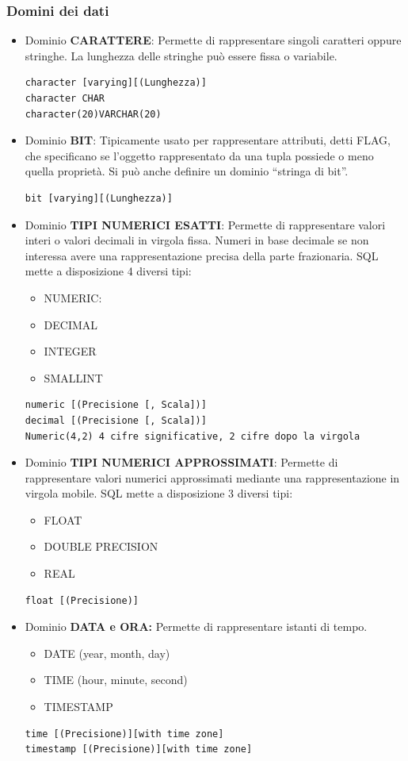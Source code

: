 \documentclass{article}
\newcommand{\sitemize}[1]{%
  \begin{itemize}[label=$\diamond$]
    #1
  \end{itemize}
}
\begin{document}
\subsubsection{Domini dei dati}
\begin{itemize}
	\item Dominio \textbf{CARATTERE}: Permette di rappresentare singoli caratteri oppure stringhe. La lunghezza delle stringhe può essere fissa o variabile.
	\begin{lstlisting}[style=sqlstyle]
character [varying][(Lunghezza)]
character CHAR
character(20)VARCHAR(20)
	\end{lstlisting}
	\item Dominio \textbf{BIT}: Tipicamente usato per rappresentare attributi, detti FLAG, che 	specificano se l'oggetto rappresentato da una tupla possiede o meno 	quella proprietà. Si può anche definire un dominio “stringa di bit”.

		\begin{lstlisting}[style=sqlstyle]
bit [varying][(Lunghezza)]
	\end{lstlisting}
	\item Dominio \textbf{TIPI NUMERICI ESATTI}: Permette di rappresentare valori interi o valori decimali in virgola
	fissa. Numeri in base decimale se non interessa avere una rappresentazione precisa della parte frazionaria. SQL mette a disposizione 4 diversi tipi: \sitemize{ 
		\item NUMERIC:
		\item DECIMAL
		\item INTEGER
		\item SMALLINT
}	
\begin{lstlisting}[style=sqlstyle]
numeric [(Precisione [, Scala])]
decimal [(Precisione [, Scala])]
Numeric(4,2) 4 cifre significative, 2 cifre dopo la virgola
\end{lstlisting}
\item Dominio \textbf{TIPI NUMERICI APPROSSIMATI}: Permette di rappresentare valori numerici approssimati mediante una
rappresentazione in virgola mobile. SQL mette a disposizione 3 diversi tipi: \sitemize{
\item FLOAT
\item DOUBLE PRECISION
\item REAL
}
\begin{lstlisting}[style=sqlstyle]
float [(Precisione)]
\end{lstlisting}
\item Dominio \textbf{DATA e ORA:} Permette di rappresentare istanti di tempo.\sitemize{
\item DATE (year, month, day)
\item TIME (hour, minute, second)
\item TIMESTAMP
}
\begin{lstlisting}[style=sqlstyle]
time [(Precisione)][with time zone]
timestamp [(Precisione)][with time zone]
\end{lstlisting}

\end{itemize}
\end{document}
